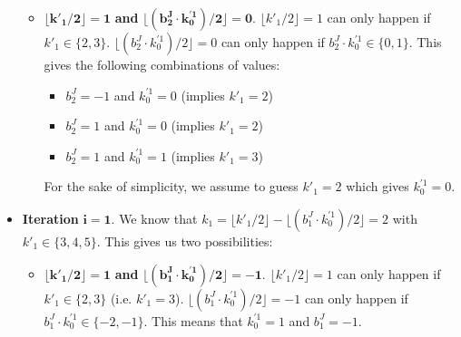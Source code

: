 \begin{itemize}
\begin{itemize}
		\item $\bm { \lfloor k'_1 / 2 \rfloor = 1 }$ \textbf{and} $ \bm{ \lfloor (b_2^J \cdot k_0^{\prime 1}) / 2 \rfloor = 0 }$.
		$\lfloor k'_1 / 2 \rfloor = 1$ can only happen if $k'_1 \in \{2, 3\}$. $ \lfloor (b_2^J \cdot k_0^{\prime 1}) / 2 \rfloor = 0$ can only happen if $b_2^J \cdot k_0^{\prime 1} \in \{0, 1\}$. 
		This gives the following combinations of values:
		\begin{itemize}
			\item $b_2^J = -1$ and $ k_0^{\prime 1} = 0$ (implies $k'_1 = 2$)
			\item $b_2^J = 1$ and $ k_0^{\prime 1} = 0$ (implies $k'_1 = 2$)
			\item $b_2^J = 1$ and $ k_0^{\prime 1} = 1$ (implies $k'_1 = 3$)
		\end{itemize}
		For the sake of simplicity, we assume to guess $k'_1 = 2$ which gives $k_0^{\prime 1} = 0$.
	\end{itemize}
	\item \textbf{Iteration} $\bm{i = 1}$. We know that $k_1 = \lfloor k'_1 / 2 \rfloor - \lfloor (b_1^J \cdot k_0^{\prime 1}) / 2 \rfloor = 2$ with $k'_1 \in \{3, 4, 5\}$. This gives us two possibilities:
	\begin{itemize}
		\item $\bm{ \lfloor k'_1 / 2 \rfloor = 1 }$ \textbf{and} $ \bm{ \lfloor (b_1^J \cdot k_0^{\prime 1}) / 2 \rfloor = -1 }$. 
		$\lfloor k'_1 / 2 \rfloor = 1 $ can only happen if $k'_1 \in \{2, 3\}$ (i.e. $k'_1 = 3$). $\lfloor (b_1^J \cdot k_0^{\prime 1}) / 2 \rfloor = -1$ can only happen if $b_1^J \cdot k_0^{\prime 1} \in \{-2, -1\}$. This means that $k_0^{\prime 1} = 1$ and $b_1^J = -1$.
		

\end{itemize}
\end{itemize}

